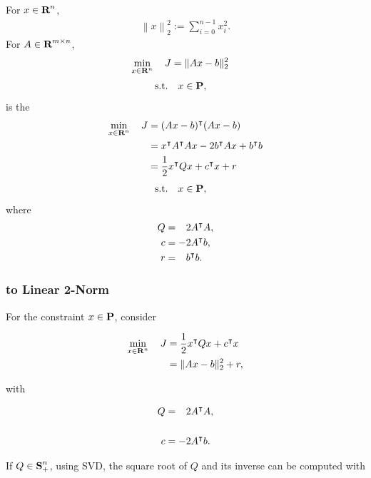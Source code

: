 \documentclass{article}
\begin{document}
    For $x\in\textbf{R}^n$, 
    \begin{align}
            \left\| x \right\|_2^2 
        :=
            \sum_{i=0}^{n-1} x_i^2.
    \end{align} 
    For $A\in\textbf{R}^{m\times n}$,
    \begin{align*}
            \min_{x\in\textbf{R}^n}
        \quad 
            J 
        &=  
            \|Ax-b\|_2^2
    \end{align*}
    \begin{align*}
        \text{s.t.}\quad &x\in\textbf{P},
    \end{align*}
    is the \QP
    \begin{align*}
        \min_{x\in\textbf{R}^n}\quad J 
    &=
        (Ax-b)^\intercal (Ax-b)              
    \\
    &=
            x^\intercal A^\intercal A x 
        -   2b^\intercal Ax 
        +   b^\intercal b\\
    &=\frac{1}{2}x^\intercal Q x +c^\intercal x + r
    \end{align*}
    \begin{align*} 
        \text{s.t.}\quad &x\in\textbf{P},
    \end{align*}
    where
    \begin{align*}
    Q &= \minus 2A^\tp A,\\
    c &= -2A^\tp b,\\
    r &= \minus b^\tp b. 
    \end{align*}

    \subsubsection{\QP to Linear 2-Norm}

    For the constraint $x\in\textbf{P}$, consider

    \begin{align*}
        \min_{x\in\textbf{R}^n}\quad J&=\frac{1}{2} x^\intercal Q x + c^\intercal x\\
        &=\|Ax-b\|_2^2+r,
    \end{align*}    

    with    

    \begin{align*}
        Q&=\minus 2A^\tp A,\\\\
        c&=-2A^\tp b.
    \end{align*}

    If $Q\in\textbf{S}^n_+$,
    using SVD, the square root of $Q$
    and its inverse can be computed with
\end{document}
